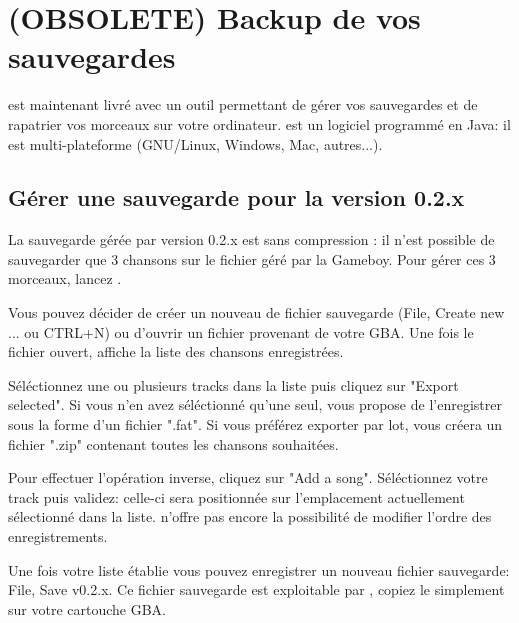 \documentclass[12pt,a4paper]{article}
\begin{document}
  \section{(OBSOLETE) Backup de vos sauvegardes}\label{burger}
  
  \FAT est maintenant livré avec un outil permettant de gérer vos sauvegardes et de rapatrier vos morceaux sur votre ordinateur. \BURGER est un logiciel programmé en Java: il est multi-plateforme (GNU/Linux, Windows, Mac, autres...).
  
    \subsection{Gérer une sauvegarde pour la version 0.2.x}
    
    La sauvegarde gérée par \FAT version 0.2.x est sans compression : il n'est possible de sauvegarder que 3 chansons sur le fichier géré par la Gameboy. Pour gérer ces 3 morceaux, lancez \BURGER.
    
    
    Vous pouvez décider de créer un nouveau de fichier sauvegarde (File, Create new ... ou CTRL+N)  ou d'ouvrir un fichier provenant de votre GBA. Une fois le fichier ouvert, \BURGER affiche la liste des chansons enregistrées.
    
    
    Séléctionnez une ou plusieurs tracks dans la liste puis cliquez sur "Export selected". Si vous n'en avez séléctionné qu'une seul, \BURGER vous propose de l'enregistrer sous la forme d'un fichier ".fat". Si vous préférez exporter par lot, \BURGER vous créera un fichier ".zip" contenant toutes les chansons souhaitées.\medskip
    
    Pour effectuer l'opération inverse, cliquez sur "Add a song". Séléctionnez votre track puis validez: celle-ci sera positionnée sur l'emplacement actuellement sélectionné dans la liste. \BURGER n'offre pas encore la possibilité de modifier l'ordre des enregistrements.\medskip
    
    Une fois votre liste établie vous pouvez enregistrer un nouveau fichier sauvegarde: File, Save v0.2.x. Ce fichier sauvegarde est exploitable par \FAT, copiez le simplement sur votre cartouche GBA.
  
\end{document}
